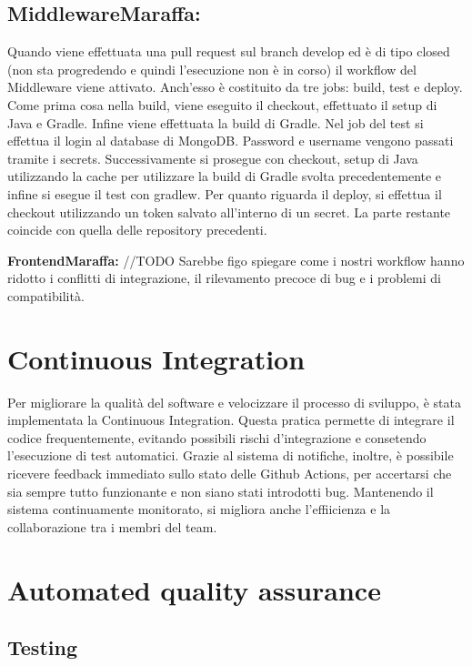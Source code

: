 \subsection{MiddlewareMaraffa:} 
Quando viene effettuata una pull request sul branch develop ed è di tipo closed
(non sta progredendo e quindi l’esecuzione non è in corso) il workflow del Middleware viene attivato.
Anch'esso è costituito da tre jobs: build, test e deploy.
Come prima cosa nella build, viene eseguito il checkout, effettuato il setup di Java e Gradle. Infine viene effettuata la 
build di Gradle.
Nel job del test si effettua il login al database di MongoDB. Password e username vengono passati tramite i secrets. Successivamente
si prosegue con checkout, setup di Java utilizzando la cache per utilizzare la build di Gradle svolta precedentemente e 
infine si esegue il test con gradlew.
Per quanto riguarda il deploy, si effettua il checkout utilizzando un token salvato all'interno di un secret. La parte
restante coincide con quella delle repository precedenti.



\item \textbf{FrontendMaraffa:} //TODO
Sarebbe figo spiegare come i nostri workflow hanno ridotto i conflitti di integrazione, il rilevamento precoce di bug e i problemi di compatibilità.


\section{Continuous Integration}
Per migliorare la qualità del software e velocizzare il processo di sviluppo, è stata implementata la Continuous Integration.
Questa pratica permette di integrare il codice frequentemente, evitando possibili rischi d'integrazione e consetendo 
l'esecuzione di test automatici. Grazie al sistema di notifiche, inoltre, è possibile ricevere feedback immediato sullo stato delle Github Actions,
per accertarsi che sia sempre tutto funzionante e non siano stati introdotti bug. Mantenendo il sistema continuamente monitorato,
si migliora anche l'effiicienza e la collaborazione tra i membri del team.

\section{Automated quality assurance}
\subsection{Testing}

